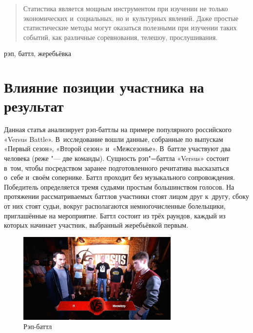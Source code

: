 \documentclass[10pt]{article}
\begin{document}


\DoFirstPageTechnicalStuff

\begin{abstract}
Статистика является мощным инструментом при изучении не только экономических и~социальных, но и~культурных явлений. Даже простые статистические методы могут оказаться полезными при изучении таких событий, как различные соревнования, телешоу, прослушивания.
\end{abstract}

\begin{keyword}
рэп, баттл, жеребьёвка
\end{keyword}



\section{Влияние позиции участника на результат}

Данная статья анализирует рэп-баттлы на примере популярного российского «Versus Battle». В~исследование вошли данные, собранные по выпускам «Первый сезон», «Второй сезон» и~«Межсезонье». В~баттле участвуют два человека (реже "--- две команды). Сущность рэп"=баттла «Versus» состоит в~том, чтобы посредством заранее подготовленного речитатива высказаться о~себе и~своём сопернике. Баттл проходит без музыкального сопровождения. Победитель определяется тремя судьями простым большинством голосов. На протяжении рассматриваемых баттлов участники стоят лицом друг к~другу, сбоку от них стоят судьи, вокруг располагаются немногочисленные болельщики, приглашённые на мероприятие. Баттл состоит из трёх раундов, каждый из которых начинает участник, выбранный жеребьёвкой первым.

\begin{figure}[htbp]
	\centering
	\includegraphics[width=8cm]{maxresdefault.jpg}
	\caption{Рэп-баттл}
\end{figure}
\end{document}

